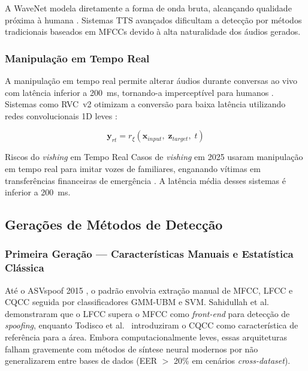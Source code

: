 \documentclass[12pt,a4paper]{article}
\begin{document}
A WaveNet modela diretamente a forma de onda bruta, alcançando qualidade
próxima à humana \cite{oord2016wavenet}. Sistemas TTS avançados dificultam a
detecção por métodos tradicionais baseados em MFCCs devido à alta naturalidade
dos áudios gerados.

\subsubsection{Manipulação em Tempo Real}

A manipulação em tempo real permite alterar áudios durante conversas ao vivo
com latência inferior a \SI{200}{\milli\second}, tornando-a imperceptível para
humanos \cite{pindrop2025}. Sistemas como RVC~v2 otimizam a conversão para
baixa latência utilizando redes convolucionais 1D leves \cite{bird2023realtime}:

\begin{equation}
\label{eq:realtime}
\mathbf{y}_{rt} = r_{\xi}(\mathbf{x}_{input},\; \mathbf{z}_{target},\; t)
\end{equation}

\begin{warningbox}{Riscos do \textit{vishing} em Tempo Real}
Casos de \textit{vishing} em 2025 usaram manipulação em tempo real para imitar
vozes de familiares, enganando vítimas em transferências financeiras de
emergência \cite{pindrop2025}. A latência média desses sistemas é inferior a
\SI{200}{\milli\second}.
\end{warningbox}

\subsection{Gerações de Métodos de Detecção}

\subsubsection{Primeira Geração --- Características Manuais e Estatística Clássica}

Até o ASVspoof 2015 \cite{wu2015asvspoof}, o padrão envolvia extração
manual de MFCC, LFCC e CQCC seguida por classificadores GMM-UBM e SVM.
Sahidullah et al.\ \cite{sahidullah2015comparison} demonstraram que o LFCC
supera o MFCC como \textit{front-end} para detecção de \textit{spoofing},
enquanto Todisco et al.\ \cite{todisco2016new} introduziram o CQCC como
característica de referência para a área. Embora computacionalmente leves,
essas arquiteturas falham gravemente com métodos de síntese neural modernos
por não generalizarem entre bases de dados
(EER $>$ 20\% em cenários \textit{cross-dataset}).
\end{document}
